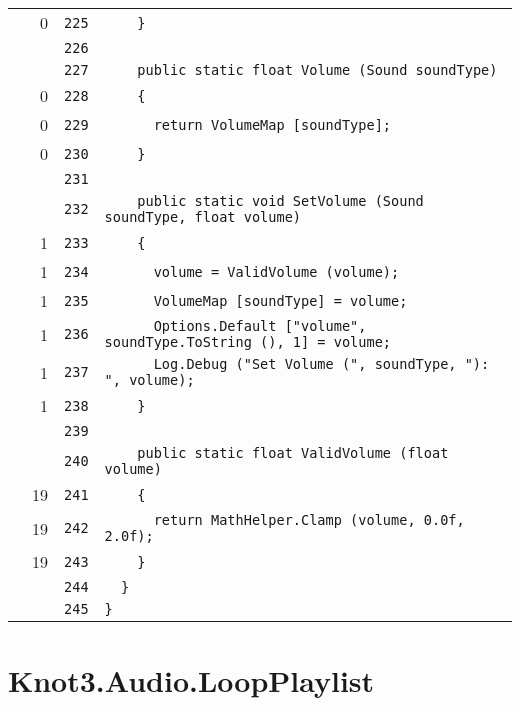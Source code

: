 \documentclass[a4paper,10pt]{article}
\begin{document}
\begin{longtable}[l]{lrrl}
\cellcolor{red} & 0 & \verb~225~ & \verb~    }~\\
\cellcolor{gray} &  & \verb~226~ & \verb~~\\
\cellcolor{gray} &  & \verb~227~ & \verb~    public static float Volume (Sound soundType)~\\
\cellcolor{red} & 0 & \verb~228~ & \verb~    {~\\
\cellcolor{red} & 0 & \verb~229~ & \verb~      return VolumeMap [soundType];~\\
\cellcolor{red} & 0 & \verb~230~ & \verb~    }~\\
\cellcolor{gray} &  & \verb~231~ & \verb~~\\
\cellcolor{gray} &  & \verb~232~ & \verb~    public static void SetVolume (Sound soundType, float volume)~\\
\cellcolor{green} & 1 & \verb~233~ & \verb~    {~\\
\cellcolor{green} & 1 & \verb~234~ & \verb~      volume = ValidVolume (volume);~\\
\cellcolor{green} & 1 & \verb~235~ & \verb~      VolumeMap [soundType] = volume;~\\
\cellcolor{green} & 1 & \verb~236~ & \verb~      Options.Default ["volume", soundType.ToString (), 1] = volume;~\\
\cellcolor{green} & 1 & \verb~237~ & \verb~      Log.Debug ("Set Volume (", soundType, "): ", volume);~\\
\cellcolor{green} & 1 & \verb~238~ & \verb~    }~\\
\cellcolor{gray} &  & \verb~239~ & \verb~~\\
\cellcolor{gray} &  & \verb~240~ & \verb~    public static float ValidVolume (float volume)~\\
\cellcolor{green} & 19 & \verb~241~ & \verb~    {~\\
\cellcolor{green} & 19 & \verb~242~ & \verb~      return MathHelper.Clamp (volume, 0.0f, 2.0f);~\\
\cellcolor{green} & 19 & \verb~243~ & \verb~    }~\\
\cellcolor{gray} &  & \verb~244~ & \verb~  }~\\
\cellcolor{gray} &  & \verb~245~ & \verb~}~\\
\end{longtable}
\newpage
\section{Knot3.Audio.LoopPlaylist}
\end{document}

